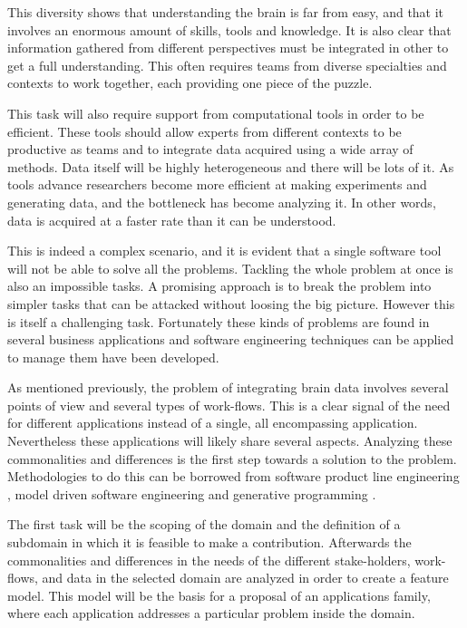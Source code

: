 This diversity shows that understanding the brain is far from easy, and that it involves an enormous amount of skills, tools and knowledge. It is also clear that  information gathered from different perspectives must be integrated in other to get a full understanding. This often requires teams from diverse specialties and contexts to work together, each providing one piece of the puzzle. 

This task will also require support from computational tools in order to be efficient. These tools should allow experts from different contexts to be productive as teams and to integrate data acquired using a wide array of methods. Data itself will be highly heterogeneous and there will be lots of it. As tools advance researchers become more efficient at making experiments and generating data, and the bottleneck has become analyzing it. In other words, data is acquired at a faster rate than it can be understood. 

This is indeed a complex scenario, and it is evident that a single software tool will not be able to solve all the problems. Tackling the whole problem at once is also an impossible tasks. A promising approach is to break the problem into simpler tasks that can be attacked without loosing the big picture. However this is itself a challenging task. Fortunately these kinds of problems are found in several business applications and  software engineering techniques can be applied to manage them have been developed. 

As mentioned previously, the problem of integrating brain data involves several points of view and several types of work-flows. This is a clear signal of the need for different applications instead of a single, all encompassing application. Nevertheless these applications will likely share several aspects. Analyzing these commonalities and differences is the first step towards a solution to the problem. 
Methodologies to do this can be borrowed from software product line engineering \autocite{pohl_software_2005}, model driven software engineering \autocite{brambilla_model-driven_2012} and generative programming \autocite{czarnecki_generative_2000}. 

The first task will be the scoping of the domain and the definition of a subdomain in which it is feasible to make a contribution. Afterwards the commonalities and differences in the needs of the different stake-holders, work-flows, and data in the selected domain are analyzed in order to create a feature model. This model will be the basis for a proposal of an applications family, where each application addresses a particular problem inside the domain. 


